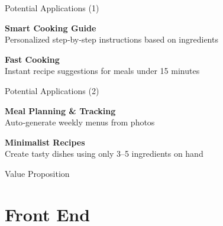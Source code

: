 \documentclass{beamer}
\begin{document}

\begin{frame}{Potential Applications (1)}
  \begin{flushleft}
    \textbf{Smart Cooking Guide}\\
    Personalized step‐by‐step instructions based on ingredients
  \end{flushleft}\vspace{4mm}
  \begin{flushright}
    \textbf{Fast Cooking}\\
    Instant recipe suggestions for meals under 15 minutes
  \end{flushright}
\end{frame}

\begin{frame}{Potential Applications (2)}
  \begin{flushleft}
    \textbf{Meal Planning \& Tracking}\\
    Auto‐generate weekly menus from photos
  \end{flushleft}\vspace{4mm}
  \begin{flushright}
    \textbf{Minimalist Recipes}\\
    Create tasty dishes using only 3--5 ingredients on hand
  \end{flushright}
\end{frame}


\begin{frame}{Value Proposition}
  \begin{center}
  \end{center}
\end{frame}







\section{Front End}
\end{document}
